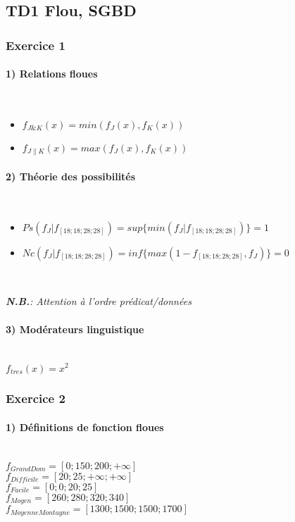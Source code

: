 \documentclass[a4paper,11pt]{article}
\begin{document}
\subsection{TD1 Flou, SGBD}
\subsubsection{Exercice 1}
\paragraph{1) Relations floues} ~\\
	\begin{itemize}
	\item $f_{J\&K}(x)=min(f_J(x),f_K(x))$
	\item $f_{J\|K}(x)=max(f_J(x),f_K(x))$
	\end{itemize}

\paragraph{2) Théorie des possibilités} ~\\
\begin{itemize}
\item $Ps(f_J|f_{[18;18;28;28]})=sup\{min(f_J|f_{[18;18;28;28]})\}=1$
\item $Nc(f_J|f_{[18;18;28;28]})=inf\{max(1-f_{[18;18;28;28]},f_J)\}=0$
\end{itemize}
~

\emph{\textbf{N.B.}: Attention à l'ordre prédicat/données}\\

\paragraph{3) Modérateurs linguistique} ~\\

$f_{tres}(x)=x^2 $

\subsubsection{Exercice 2}

\paragraph{1) Définitions de fonction floues} ~\\

\noindent $f_{GrandDom}=[0;150;200;+\infty]$\\
$f_{Difficile}=[20;25;+\infty;+\infty]$\\
$f_{Facile}=[0;0;20;25]$\\
$f_{Moyen}=[260;280;320;340]$\\
$f_{MoyenneMontagne}=[1300;1500;1500;1700]$\\
\end{document}
